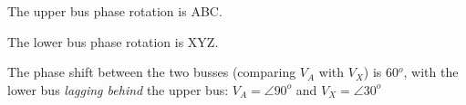 The upper bus phase rotation is ABC.

\vskip 10pt

The lower bus phase rotation is XYZ.

\vskip 10pt

The phase shift between the two busses (comparing $V_A$ with $V_X$) is 60$^{o}$, with the lower bus {\it lagging behind} the upper bus: $V_A = \angle 90^o$ and $V_X = \angle 30^o$










